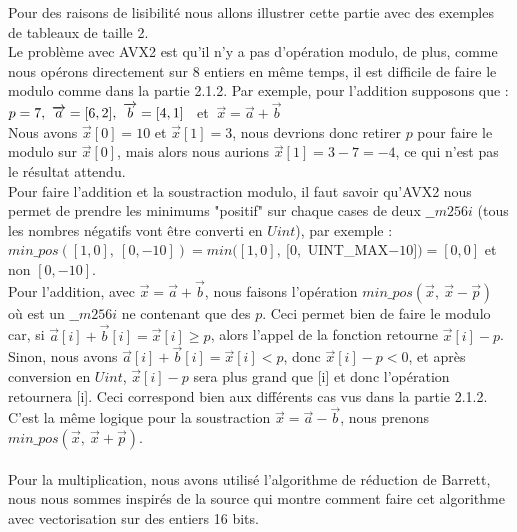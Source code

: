 \documentclass[12pt, a4paper]{article}
\begin{document}
Pour des raisons de lisibilité nous allons illustrer cette partie avec des exemples de tableaux de taille 2. \\
\indent Le problème avec AVX2 est qu'il n'y a pas d'opération modulo, de plus, comme nous opérons directement sur 8 entiers en même temps, il est difficile de faire le modulo comme dans la partie 2.1.2.
Par exemple, pour l'addition supposons que : \\
$p = 7, \ \overrightarrow{a} = [6, 2], \ \space \overrightarrow{b} = [4, 1]$ \ et $ \ \overrightarrow{x} = \overrightarrow{a}+\overrightarrow{b}$ \\
Nous avons $\overrightarrow{x}[0] = 10$ et $\overrightarrow{x}[1] = 3$, nous devrions donc retirer $p$ pour faire le modulo sur $\overrightarrow{x}[0]$, mais alors nous aurions $\overrightarrow{x}[1] = 3-7 = -4$, ce qui n'est pas le résultat attendu.\\ 
\indent Pour faire l'addition et la soustraction modulo, il faut savoir qu'AVX2 nous permet de prendre les minimums "positif" sur chaque cases de deux $\_\_m256i$ (tous les nombres négatifs vont être converti en $Uint$), par exemple :\\ $min\_pos([1, 0],\  [0, -10]) = min([1, 0], \ [0,$ UINT\_MAX$-10]) = [0, 0]$ et non $[0, -10]$. \\
\indent Pour l'addition, avec $\overrightarrow{x} = \overrightarrow{a}+\overrightarrow{b}$, nous faisons l'opération $min\_pos(\overrightarrow{x},\ \overrightarrow{x}-\overrightarrow{p})$ où  est un $\_\_m256i$ ne contenant que des $p$. Ceci permet bien de faire le modulo car, si \linebreak $\overrightarrow{a}[i] + \overrightarrow{b}[i] = \overrightarrow{x}[i] \geq p$, alors l'appel de la fonction retourne $\overrightarrow{x}[i] - p$. Sinon, nous avons \linebreak $\overrightarrow{a}[i] + \overrightarrow{b}[i] = \overrightarrow{x}[i] < p$, donc $\overrightarrow{x}[i]-p < 0$, et après conversion en $Uint$, $\overrightarrow{x}[i]-p$ sera plus grand que [i] et donc l'opération retournera [i]. Ceci correspond bien aux différents cas vus dans la partie 2.1.2. \\
C'est la même logique pour la soustraction $\overrightarrow{x} = \overrightarrow{a}-\overrightarrow{b}$, nous prenons $min\_pos(\overrightarrow{x},\ \overrightarrow{x}+\overrightarrow{p})$. \\ \\
\indent Pour la multiplication, nous avons utilisé l'algorithme de réduction de Barrett, nous nous sommes inspirés de la source \cite{SIMD} qui montre comment faire cet algorithme avec vectorisation sur des entiers 16 bits.
\end{document}

